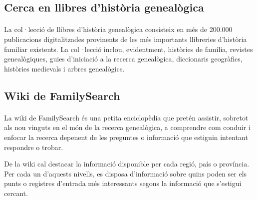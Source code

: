     \subsection{Cerca en llibres d'història genealògica}

        \paragraph{}
        La col·lecció de llibres d’història genealògica consisteix en més de 200.000 publicacions digitalitzades provinents de les més importants llibreries d’història familiar existents. La col·lecció inclou, evidentment, històries de família, revistes genealògiques, guies d’iniciació a la recerca genealògica, diccionaris geogràfics, històries medievals i arbres genealògics.


    \subsection{Wiki de FamilySearch}

        \paragraph{}
        La wiki de FamilySearch és una petita enciclopèdia que pretén assistir, sobretot als nou vinguts en el món de la recerca genealògica, a comprendre com conduir i enfocar la recerca depenent de les preguntes o informació que estiguin intentant respondre o trobar.

        De la wiki cal destacar la informació disponible per cada regió, país o província. Per cada un d'aquests nivells, es disposa d'informació sobre quins poden ser els punts o registres d’entrada més interessants segons la informació que s'estigui cercant.
